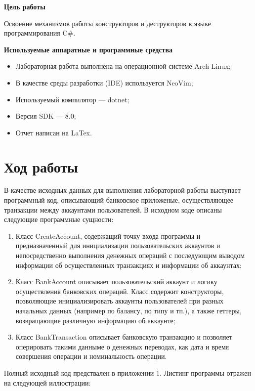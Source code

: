 {\bfseries Цель работы} 

Освоение механизмов работы конструкторов и деструкторов в языке программирования C\#.

{\bfseries Используемые аппаратные и программные средства}
\begin{itemize}
    \item Лабораторная работа выполнена на операционной системе Arch Linux;
    \item В качестве среды разработки (IDE) используется NeoVim;
    \item Используемый компилятор --- dotnet;
    \item Версия SDK --- 8.0;
    \item Отчет написан на LaTex.
\end{itemize}


\chapter{Ход работы}
    
В качестве исходных данных для выполнения лабораторной работы выступает программный код, описывающий банковское приложеные, осуществляющее транзакции между аккаунтами пользователей. В исходном коде описаны следующие программные сущности:

\begin{enumerate}
    \item Класс CreateAccount, содержащий точку входа программы и предназначенный для инициализации пользовательских аккаунтов и непосредственно выполнения денежных операций с последующим выводом информации об осуществленных транзакциях и информации об аккаунтах;
    \item Класс BankAccount описывает пользовательский аккаунт и логику осуществления банковских операций. Класс содержит конструкторы, позволяющие инициализировать аккаунты пользователей при разных начальных данных (например по балансу, по типу и тп.), а также геттеры, возвращающие различную информацию об аккаунте;
    \item Класс BankTransaction описывает банковскую транзакцию и позволяет оперировать такими данныме о денежных переводах, как дата и время совершения операции и номинальность операции.
\end{enumerate}

\newpage

Полный исходный код предствален в приложении 1. 
Листинг программы отражен на следующей иллюстрации:

